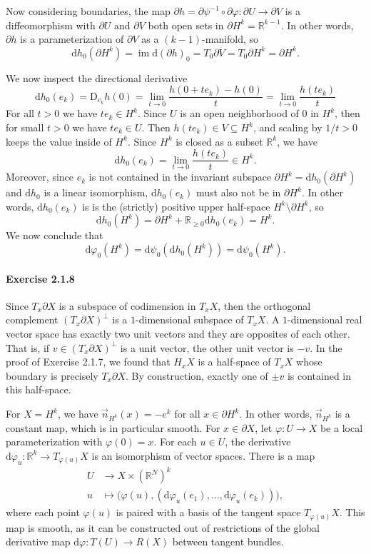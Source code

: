 \documentclass[12pt]{article}
\newcommand{\pnum}[1]{\paragraph{#1}}
\theoremstyle{definition}
\newcommand{\R}{\mathbb{R}}
\renewcommand{\phi}{\varphi}
\newcommand{\<}{\langle}
\renewcommand{\>}{\rangle}
\newcommand{\seq}{\subseteq}
\DeclareMathOperator{\im}{im}
\newcommand{\dd}{\mathrm{d}}
\newcommand{\bd}{\partial}
\begin{document}
Now considering boundaries, the map $\bd h = \bd\psi^{-1} \circ \bd\phi : \bd U \to \bd V$ is a diffeomorphism with $\bd U$ and $\bd V$ both open sets in $\bd H^k = \R^{k-1}$.
In other words, $\bd h$ is a parameterization of $\bd V$ as a $(k-1)$-manifold, so
\[
    \dd{h}_0(\bd H^k)
        = \im \dd(\bd h)_0
        = T_0\bd V
        = T_0\bd H^k
        = \bd H^k.
\]

We now inspect the directional derivative
\[
    \dd{h}_0(e_k)
        = \mathrm{D}_{e_k}h(0)
        = \lim_{t \to 0} \frac{h(0 + te_k) - h(0)}{t}
        = \lim_{t \to 0} \frac{h(te_k)}{t}
\]
For all $t > 0$ we have $te_k \in H^k$.
Since $U$ is an open neighborhood of $0$ in $H^k$, then for small $t > 0$ we have $te_k \in U$.
Then $h(te_k) \in V \seq H^k$, and scaling by $1/t > 0$ keeps the value inside of $H^k$.
Since $H^k$ is closed as a subset $\R^k$, we have
\[
    \dd{h}_0(e_k) = \lim_{t \to 0} \frac{h(te_k)}{t} \in H^k.
\]
Moreover, since $e_k$ is not contained in the invariant subspace $\bd H^k = \dd{h}_0(\bd H^k)$ and $\dd{h}_0$ is a linear isomorphism, $\dd{h}_0(e_k)$ must also not be in $\bd H^k$.
In other words, $\dd{h}_0(e_k)$ is is the (strictly) positive upper half-space $H^k \setminus \bd{H^k}$, so
\[
    \dd{h}_0(H^k) = \bd H^k + \R_{\geq 0}\dd{h}_0(e_k) = H^k.
\]
We now conclude that
\[
    \dd{\phi}_0(H^k) = \dd{\psi}_0(\dd{h}_0(H^k)) = \dd{\psi}_0(H^k).
\]


\pnum{Exercise 2.1.8}

Since $T_x\bd X$ is a subspace of codimension in $T_xX$, then the orthogonal complement $(T_x\bd X)^\perp$ is a $1$-dimensional subspace of $T_xX$.
A $1$-dimensional real vector space has exactly two unit vectors and they are opposites of each other.
That is, if $v \in (T_x\bd X)^\perp$ is a unit vector, the other unit vector is $-v$.
In the proof of Exercise 2.1.7, we found that $H_xX$ is a half-space of $T_xX$ whose boundary is precisely $T_x\bd X$.
By construction, exactly one of $\pm v$ is contained in this half-space.

For $X = H^k$, we have $\vec{n}_{H^k}(x) = -e^k$ for all $x \in \bd H^k$.
In other words, $\vec{n}_{H^k}$ is a constant map, which is in particular smooth.
For $x \in \bd X$, let $\phi : U \to X$ be a local parameterization with $\phi(0) = x$.
For each $u \in U$, the derivative $\dd{\phi}_u : \R^k \to T_{\phi(u)}X$ is an isomorphism of vector spaces.
There is a map
\begin{align*}
    U &\longrightarrow X \times (\R^N)^k \\
    u &\longmapsto \big(\phi(u), (\dd{\phi}_u(e_1), \dots, \dd{\phi}_u(e_k))\big),
\end{align*}
where each point $\phi(u)$ is paired with a basis of the tangent space $T_{\phi(u)}X$.
This map is smooth, as it can be constructed out of restrictions of the global derivative map $\dd{\phi} : T(U) \to R(X)$ between tangent bundles.
\end{document}
